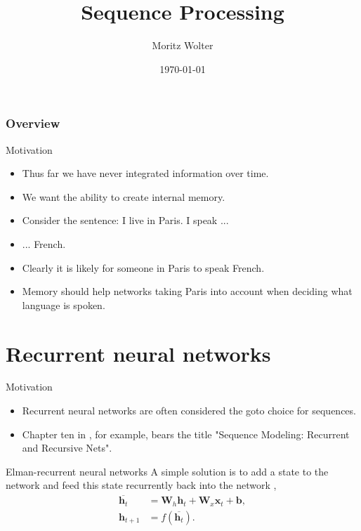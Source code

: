 \documentclass{beamer}
\title{Sequence Processing}
\date{\today}
\institute{High-Performance Computing and Analytics Lab, Uni Bonn}
\author{Moritz Wolter}
\begin{document}
    \maketitle

    \begin{frame}
    \frametitle{Overview} 
    \tableofcontents

    \end{frame}

    \begin{frame}{Motivation}
      \begin{itemize}
        \item Thus far we have never integrated information over time.
        \item We want the ability to create internal memory.
        \item Consider the sentence: I live in Paris. I speak ...
        \item ... French.
        \item Clearly it is likely for someone in Paris to speak French.
        \item Memory should help networks taking Paris into account when deciding what language is spoken.
      \end{itemize}
    \end{frame}

    \section{Recurrent neural networks}

    \begin{frame}{Motivation}
      \begin{itemize}
        \item Recurrent neural networks are often considered the goto choice for sequences.
        \item Chapter ten in \cite{goodfellow2016deep}, for example, bears the title "Sequence Modeling: Recurrent and Recursive Nets".
      \end{itemize}
     \end{frame}


    \begin{frame}{Elman-recurrent neural networks}
    A simple solution is to add a state to the network and feed this state recurrently back into the network \cite{elman1990finding},
    \begin{align}
        \overline{\mathbf{h}_t} &= \mathbf{W}_h \mathbf{h}_t 
            + \mathbf{W}_x \mathbf{x}_t + \mathbf{b}, \label{eq:simple_rnn} \\
        \mathbf{h}_{t+1} &= f(\overline{\mathbf{h}_t}).
    \end{align}
    \end{frame}
\end{document}
